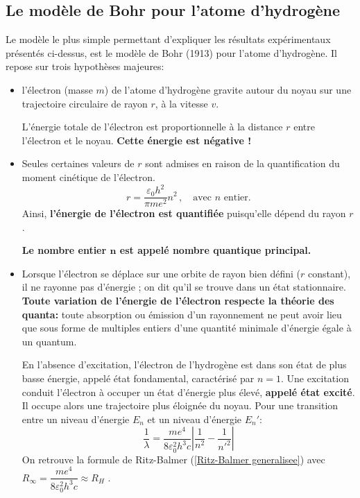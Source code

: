 \documentclass{article}
\begin{document}
\subsection{Le modèle de Bohr pour l'atome d'hydrogène}
\noindent Le modèle le plus simple permettant d'expliquer les résultats expérimentaux présentés ci-dessus,
est le modèle de Bohr (1913) pour l'atome d'hydrogène.
Il repose sur trois hypothèses majeures: 
\begin{itemize}[label=$\ast$]
    \item l'électron (masse $m$) de l'atome d'hydrogène gravite autour du noyau
    sur une trajectoire circulaire de rayon $r$, à la vitesse $v$.

    L'énergie totale de l'électron est proportionnelle à la distance $r$ entre l'électron et le noyau.
    \textbf{Cette énergie est négative !}

    \item Seules certaines valeurs de $r$ sont admises en raison de la quantification du moment cinétique de l'électron.
    $$r=\frac{\varepsilon_0 h^2}{\pi me^2}n^2\, ,\quad \text{avec $n$ entier.}$$
    Ainsi, \textbf{l'énergie de l'électron est quantifiée} puisqu'elle dépend du rayon $r$.
    
    \textbf{Le nombre entier $\bm{n}$ est appelé nombre quantique principal.}
        \vspace{5mm}
    \item  Lorsque l'électron se déplace sur une orbite de rayon bien défini ($r$ constant),
    il ne rayonne pas d'énergie ; on dit qu'il se trouve dans un état stationnaire.
    \textbf{Toute variation de l'énergie de l'électron respecte la théorie des quanta:}
    toute absorption ou émission d'un rayonnement ne peut avoir lieu que sous forme de
    multiples entiers d'une quantité minimale d'énergie égale à un quantum.
    
    En l'absence d'excitation, l'électron de l'hydrogène est dans son état de plus basse énergie,
    appelé état fondamental, caractérisé par $n=1$.
    Une excitation conduit l'électron à occuper un état d'énergie plus élevé,
    \textbf{appelé état excité}. Il occupe alors une trajectoire plus éloignée du noyau.
    Pour une transition entre un niveau d'énergie $E_n$ et un niveau d'énergie $E_n'$: 
    $$\frac{1}{\lambda}=\frac{me^4}{8\varepsilon_0^2h^3c}\left| \frac{1}{n^2}-\frac{1}{n'^2}\right|$$ 
    On retrouve la formule de Ritz-Balmer (\ref{Ritz-Balmer generalisee}) avec $R_\infty=\dfrac{me^4}{8\varepsilon_0^2h^3c} \approx R_H$ .
\end{itemize}
\end{document}

